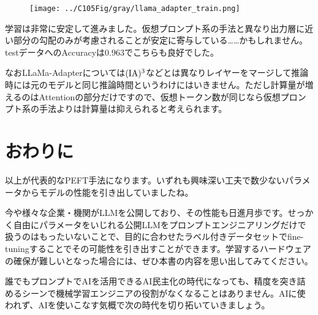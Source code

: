\documentclass[a5paper,twoside,dvipdfmx]{jsarticle}
\begin{document}
\begin{figure}[h]
  \centering
  \texttt{[image: ../C105Fig/gray/llama\_adapter\_train.png]}
 \end{figure} 

学習は非常に安定して進みました。仮想プロンプト系の手法と異なり出力層に近い部分の勾配のみが考慮されることが安定に寄与している……かもしれません。testデータへのAccuracyは0.963でこちらも良好でした。

なおLLaMa-Adapterについては$\rm{(IA)^3}$などとは異なりレイヤーをマージして推論時には元のモデルと同じ推論時間というわけにはいきません。ただし計算量が増えるのはAttentionの部分だけですので、仮想トークン数が同じなら仮想プロンプト系の手法よりは計算量は抑えられると考えられます。

\newpage

\section{おわりに}

以上が代表的なPEFT手法になります。いずれも興味深い工夫で数少ないパラメータからモデルの性能を引き出していましたね。

今や様々な企業・機関がLLMを公開しており、その性能も日進月歩です。せっかく自由にパラメータをいじれる公開LLMをプロンプトエンジニアリングだけで扱うのはもったいないことで、目的に合わせたラベル付きデータセットでfine-tuningすることでその可能性を引き出すことができます。学習するハードウェアの確保が難しいとなった場合には、ぜひ本書の内容を思い出してみてください。

誰でもプロンプトでAIを活用できるAI民主化の時代になっても、精度を突き詰めるシーンで機械学習エンジニアの役割がなくなることはありません。AIに使われず、AIを使いこなす気概で次の時代を切り拓いていきましょう。

\newpage

\thispagestyle{empty} 
\end{document}
